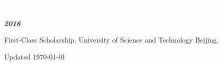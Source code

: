 \documentclass[12pt,a4paper,utf8]{report}
\begin{document}
\begin{minipage}[t]{16cm}
    \begin{snugshade}{\textcolor{white}{\textsf{\quad 
        AWARDS AND HONORS
    \qquad}}}\end{snugshade}
\end{minipage}\par
\vspace{0.2cm}\hspace{0.5cm}
\begin{minipage}[t]{15cm}
    {\textbf{\em{2016}}}\par
    \quad First-Class Scholarship, University of Science and Technology Beijing.\par
    \vspace{0.2cm}
\end{minipage}\par
\vspace{0.4cm}

\begin{center}\vspace{1.0cm}
    Updated \monthyeardate\today
\end{center}
\end{document}

